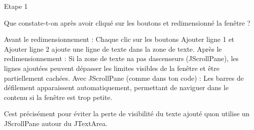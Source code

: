 Etape 1

Que constate-\/t-\/on après avoir cliqué sur les boutons et redimensionné la fenêtre ?

Avant le redimensionnement \+: Chaque clic sur les boutons Ajouter ligne 1 et Ajouter ligne 2 ajoute une ligne de texte dans la zone de texte. Après le redimensionnement \+: Si la zone de texte n\textquotesingle{}a pas d\textquotesingle{}ascenseurs (JScroll\+Pane), les lignes ajoutées peuvent dépasser les limites visibles de la fenêtre et être partiellement cachées. Avec JScroll\+Pane (comme dans ton code) \+: Les barres de défilement apparaissent automatiquement, permettant de naviguer dans le contenu si la fenêtre est trop petite.

C\textquotesingle{}est précisément pour éviter la perte de visibilité du texte ajouté qu\textquotesingle{}on utilise un JScroll\+Pane autour du JText\+Area. 